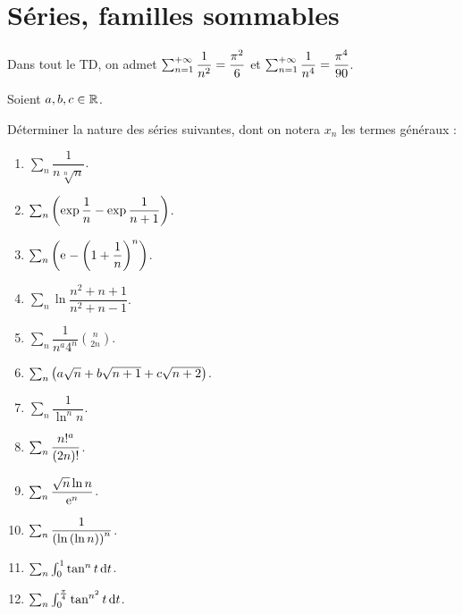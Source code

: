 \chapter{Séries, familles sommables}

\minitoc

Dans tout le TD, on admet \(\sum_{n=1}^{+\infty}\dfrac{1}{n^2}=\dfrac{\pi^2}{6}\) et \(\sum_{n=1}^{+\infty}\dfrac{1}{n^4}=\dfrac{\pi^4}{90}\).

\begin{exo}[Exercice 1]
Soient \(a,b,c\in\mathbb{R}\).

Déterminer la nature des séries suivantes, dont on notera \(x_n\) les termes généraux :

\begin{enumerate}
\item \(\sum_n\dfrac{1}{n\sqrt[n]{n}}\). \\

\item \(\sum_n\left(\exp\dfrac{1}{n}-\exp\dfrac{1}{n+1}\right)\). \\

\item \(\sum_n\left(\mathrm{e}^{}-\left(1+\dfrac{1}{n}\right)^n\right)\). \\

\item \(\sum_n\ln\dfrac{n^2+n+1}{n^2+n-1}\). \\

\item \(\sum_n\dfrac{1}{n^a4^n}\binom{n}{2n}\). \\

\item \(\sum_n\left(a\sqrt{n}+b\sqrt{n+1}+c\sqrt{n+2}\right)\). \\

\item \(\sum_n\dfrac{1}{\ln^nn}\). \\

\item \(\sum_n\dfrac{n!^a}{\left(2n\right)!}\). \\

\item \(\sum_n\dfrac{\sqrt{n}\ln n}{\mathrm{e}^{n}}\). \\

\item \(\sum_n\dfrac{1}{\left(\ln\left(\ln n\right)\right)^n}\). \\

\item \(\sum_n\int_0^1\tan^nt\odif{t}\). \\

\item \(\sum_n\int_0^{\frac{\pi}{4}}\tan^{n^2}t\odif{t}\).
\end{enumerate}
\end{exo}

